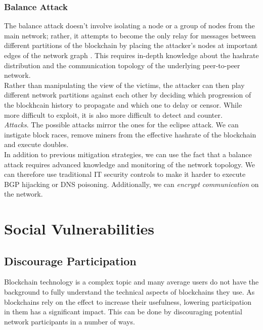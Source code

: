 \documentclass[12pt,a4paper]{article}
\begin{document}
\subsubsection{Balance Attack}

The balance attack doesn't involve isolating a node or a group of nodes from the main network; rather, it attempts to become the only relay for messages between different partitions of the \gls{blockchain} by placing the attacker's nodes at important edges of the network graph \cite{balance}. This requires in-depth knowledge about the \gls{hashrate} distribution and the communication topology of the underlying peer-to-peer network.\\

Rather than manipulating the view of the victims, the attacker can then play different network partitions against each other by deciding which progression of the blockhcain history to propagate and which one to delay or censor. While more difficult to exploit, it is also more difficult to detect and counter.\\

\textit{Attacks}. The possible attacks mirror the ones for the eclipse attack. We can instigate block races, remove \glspl{miner} from the effective \gls{hashrate} of the \gls{blockchain} and execute \glspl{double}.\\

In addition to previous mitigation strategies, we can use the fact that a balance attack requires advanced knowledge and monitoring of the network topology. We can therefore use traditional IT security controls to make it harder to execute BGP hijacking or DNS poisoning. Additionally, we can \textit{encrypt communication} on the network.\\

\section{Social Vulnerabilities}

\subsection{Discourage Participation}

Blockchain technology is a complex topic and many average users do not have the background to fully understand the technical aspects of \glspl{blockchain} they use. As \glspl{blockchain} rely on the \gls{effect} to increase their usefulness, lowering participation in them has a significant impact. This can be done by discouraging potential network participants in a number of ways.\\
\end{document}
